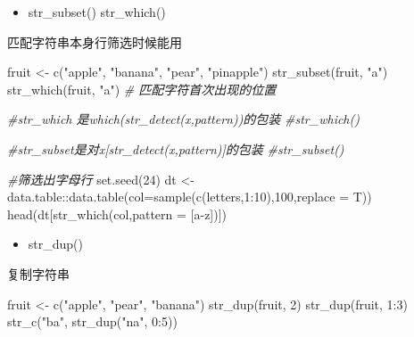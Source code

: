 \documentclass[
]{book}
\newenvironment{Shaded}{\begin{snugshade}}{\end{snugshade}}
\newcommand{\AttributeTok}[1]{\textcolor[rgb]{0.77,0.63,0.00}{#1}}
\newcommand{\CommentTok}[1]{\textcolor[rgb]{0.56,0.35,0.01}{\textit{#1}}}
\newcommand{\DecValTok}[1]{\textcolor[rgb]{0.00,0.00,0.81}{#1}}
\newcommand{\FunctionTok}[1]{\textcolor[rgb]{0.00,0.00,0.00}{#1}}
\newcommand{\NormalTok}[1]{#1}
\newcommand{\OtherTok}[1]{\textcolor[rgb]{0.56,0.35,0.01}{#1}}
\newcommand{\SpecialCharTok}[1]{\textcolor[rgb]{0.00,0.00,0.00}{#1}}
\newcommand{\StringTok}[1]{\textcolor[rgb]{0.31,0.60,0.02}{#1}}
\providecommand{\tightlist}{%
  \setlength{\itemsep}{0pt}\setlength{\parskip}{0pt}}
\begin{document}
\begin{itemize}
\tightlist
\item
  str\_subset() str\_which()
\end{itemize}

匹配字符串本身行筛选时候能用

\begin{Shaded}
\begin{Highlighting}[]

\NormalTok{fruit }\OtherTok{\textless{}{-}} \FunctionTok{c}\NormalTok{(}\StringTok{"apple"}\NormalTok{, }\StringTok{"banana"}\NormalTok{, }\StringTok{"pear"}\NormalTok{, }\StringTok{"pinapple"}\NormalTok{)}
\FunctionTok{str\_subset}\NormalTok{(fruit, }\StringTok{"a"}\NormalTok{)}
\FunctionTok{str\_which}\NormalTok{(fruit, }\StringTok{"a"}\NormalTok{) }\CommentTok{\# 匹配字符首次出现的位置}
\end{Highlighting}
\end{Shaded}

\begin{Shaded}
\begin{Highlighting}[]
\CommentTok{\#str\_which 是which(str\_detect(x,pattern))的包装}
\CommentTok{\#str\_which()}

\CommentTok{\#str\_subset是对x[str\_detect(x,pattern)]的包装}
\CommentTok{\#str\_subset()}

\CommentTok{\#筛选出字母行}
\FunctionTok{set.seed}\NormalTok{(}\DecValTok{24}\NormalTok{)}
\NormalTok{dt }\OtherTok{\textless{}{-}}\NormalTok{ data.table}\SpecialCharTok{::}\FunctionTok{data.table}\NormalTok{(}\AttributeTok{col=}\FunctionTok{sample}\NormalTok{(}\FunctionTok{c}\NormalTok{(letters,}\DecValTok{1}\SpecialCharTok{:}\DecValTok{10}\NormalTok{),}\DecValTok{100}\NormalTok{,}\AttributeTok{replace =}\NormalTok{ T))}
\FunctionTok{head}\NormalTok{(dt[}\FunctionTok{str\_which}\NormalTok{(col,}\AttributeTok{pattern =} \StringTok{\textquotesingle{}[a{-}z]\textquotesingle{}}\NormalTok{)])}
\end{Highlighting}
\end{Shaded}

\begin{itemize}
\tightlist
\item
  str\_dup()
\end{itemize}

复制字符串

\begin{Shaded}
\begin{Highlighting}[]
\NormalTok{fruit }\OtherTok{\textless{}{-}} \FunctionTok{c}\NormalTok{(}\StringTok{"apple"}\NormalTok{, }\StringTok{"pear"}\NormalTok{, }\StringTok{"banana"}\NormalTok{)}
\FunctionTok{str\_dup}\NormalTok{(fruit, }\DecValTok{2}\NormalTok{)}
\FunctionTok{str\_dup}\NormalTok{(fruit, }\DecValTok{1}\SpecialCharTok{:}\DecValTok{3}\NormalTok{)}
\FunctionTok{str\_c}\NormalTok{(}\StringTok{"ba"}\NormalTok{, }\FunctionTok{str\_dup}\NormalTok{(}\StringTok{"na"}\NormalTok{, }\DecValTok{0}\SpecialCharTok{:}\DecValTok{5}\NormalTok{))}
\end{Highlighting}
\end{Shaded}
\end{document}
